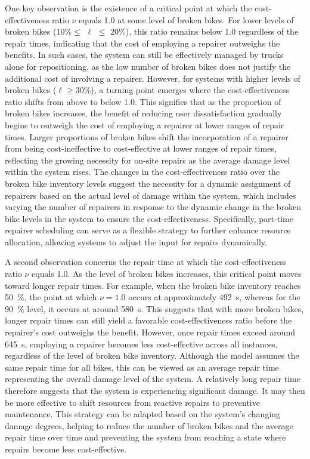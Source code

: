 One key observation is the existence of a critical point at which the cost-effectiveness ratio
\emph{\(\nu\)} equals 1.0 at some level of broken bikes. For lower levels of broken bikes (10\%\ensuremath{\leq} \(\ell\) \ensuremath{\leq}
20\%), this ratio remains below 1.0 regardless of the repair times, indicating that the cost of
employing a repairer outweighs the benefits. In such cases, the system can still be effectively
managed by trucks alone for repositioning, as the low number of broken bikes does not justify the
additional cost of involving a repairer. However, for systems with higher levels of broken bikes
(\(\ell\)\ensuremath{\geq}30\%), a turning point emerges where the cost-effectiveness ratio shifts from above to below 1.0.
This signifies that as the proportion of broken bikes increases, the benefit of reducing user
dissatisfaction gradually begins to outweigh the cost of employing a repairer at lower ranges of
repair times. Larger proportions of broken bikes shift the incorporation of a repairer from being
cost-ineffective to cost-effective at lower ranges of repair times, reflecting the growing necessity
for on-site repairs as the average damage level within the system rises. The changes in the
cost-effectiveness ratio over the broken bike inventory levels suggest the necessity for a dynamic
assignment of repairers based on the actual level of damage within the system, which includes
varying the number of repairers in response to the dynamic change in the broken bike levels in the
system to ensure the cost-effectiveness. Specifically, part-time repairer scheduling can serve as a
flexible strategy to further enhance resource allocation, allowing systems to adjust the input for
repairs dynamically.

A second observation concerns the repair time at which the cost-effectiveness
ratio \(\nu\) equals 1.0. As the level of broken bikes
increases, this critical point moves toward longer repair times. For example,
when the broken bike inventory reaches 50~\%, the point at which \(\nu=1.0\)
occurs at approximately 492~s, whereas for the 90~\% level, it occurs at around
580~s. This suggests that with more broken bikes, longer repair times can still
yield a favorable cost-effectiveness ratio before the repairer's cost outweighs
the benefit. However, once repair times exceed around 645~s, employing a
repairer becomes less cost-effective across all instances, regardless of the
level of broken bike inventory. Although the model assumes the same repair time
for all bikes, this can be viewed as an average repair time representing the
overall damage level of the system. A relatively long repair time therefore
suggests that the system is experiencing significant damage. It may then be more
effective to shift resources from reactive repairs to preventive maintenance.
This strategy can be adapted based on the system's changing damage degrees,
helping to reduce the number of broken bikes and the average repair time over
time and preventing the system from reaching a state where repairs become less
cost-effective.

